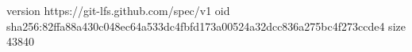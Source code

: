 version https://git-lfs.github.com/spec/v1
oid sha256:82ffa88a430c048ec64a533dc4fbfd173a00524a32dcc836a275bc4f273ccde4
size 43840
